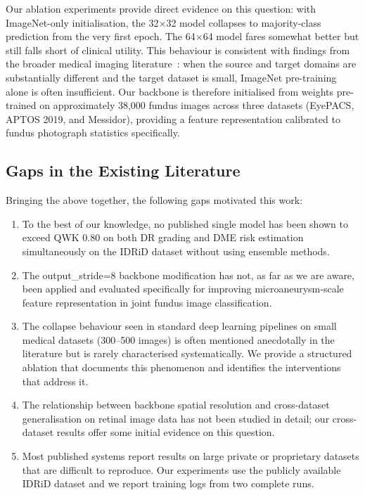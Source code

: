 \documentclass[12pt,a4paper]{article}
\begin{document}
Our ablation experiments provide direct evidence on this question: with ImageNet-only initialisation, the 32$\times$32 model collapses to majority-class prediction from the very first epoch. The 64$\times$64 model fares somewhat better but still falls short of clinical utility. This behaviour is consistent with findings from the broader medical imaging literature~\cite{Rajpurkar2017CheXNet, Esteva2019}: when the source and target domains are substantially different and the target dataset is small, ImageNet pre-training alone is often insufficient. Our backbone is therefore initialised from weights pre-trained on approximately 38,000 fundus images across three datasets (EyePACS, APTOS 2019, and Messidor), providing a feature representation calibrated to fundus photograph statistics specifically.

\subsection{Gaps in the Existing Literature}

Bringing the above together, the following gaps motivated this work:

\begin{enumerate}
    \item To the best of our knowledge, no published single model has been shown to exceed QWK 0.80 on both DR grading and DME risk estimation simultaneously on the IDRiD dataset without using ensemble methods.

    \item The output\_stride=8 backbone modification has not, as far as we are aware, been applied and evaluated specifically for improving microaneurysm-scale feature representation in joint fundus image classification.

    \item The collapse behaviour seen in standard deep learning pipelines on small medical datasets (300--500 images) is often mentioned anecdotally in the literature but is rarely characterised systematically. We provide a structured ablation that documents this phenomenon and identifies the interventions that address it.

    \item The relationship between backbone spatial resolution and cross-dataset generalisation on retinal image data has not been studied in detail; our cross-dataset results offer some initial evidence on this question.

    \item Most published systems report results on large private or proprietary datasets that are difficult to reproduce. Our experiments use the publicly available IDRiD dataset and we report training logs from two complete runs.
\end{enumerate}
\end{document}
